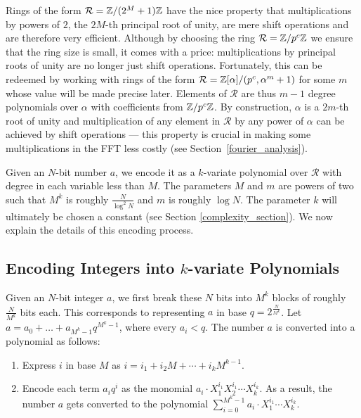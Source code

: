\documentclass[11pt]{article}
\begin{document}
Rings of the form $\mathcal{R} = \mathbb{Z}/(2^M + 1) \mathbb{Z}$ have the nice
property that multiplications by powers of $2$, the $2M$-th principal
root of unity, are mere shift operations and are therefore very
efficient. Although by choosing the ring $\mathcal{R} = \mathbb{Z}/p^c\mathbb{Z}$ we
ensure that the ring size is small, it comes with a price:
multiplications by principal roots of unity are no longer just shift
operations. Fortunately, this can be redeemed by working with rings of
the form $\mathcal{R} = \mathbb{Z}[\alpha]/(p^c, \alpha^m + 1)$ for some $m$
whose value will be made precise later. Elements of $\mathcal{R}$ are
thus $m-1$ degree polynomials over $\alpha$ with coefficients from
$\mathbb{Z}/p^c\mathbb{Z}$. By construction, $\alpha$ is a $2m$-th root of unity and
multiplication of any element in $\mathcal{R}$ by any power of
$\alpha$ can be achieved by shift operations --- this property is
crucial in making some multiplications in the FFT less costly (see
Section~\ref{fourier_analysis}).

Given an $N$-bit number $a$, we encode it as a $k$-variate polynomial
over $\mathcal{R}$ with degree in each variable less than $M$. The
parameters $M$ and $m$ are powers of two such that $M^k$ is roughly
$\frac{N}{\log^2N}$ and $m$ is roughly $\log{N}$. The parameter $k$
will ultimately be chosen a constant (see Section
\ref{complexity_section}). We now explain the details of this encoding
process.

\subsection{Encoding Integers into $k$-variate
  Polynomials}\label{encoding_section}

Given an $N$-bit integer $a$, we first break these $N$ bits into $M^k$
blocks of roughly $\frac{N}{M^k}$ bits each. This corresponds to
representing $a$ in base $q = 2^{\frac{N}{M^k}}$.  Let $a = a_0 +
\ldots + a_{M^k-1}q^{M^k - 1}$, where every $a_i < q$. The number $a$
is converted into a polynomial as follows:
\begin{enumerate}
\item Express $i$ in base $M$ as $i = i_1 + i_2M + \cdots +
  i_kM^{k-1}$. \label{base_M_item}
\item Encode each term $a_iq^i$ as the monomial $a_i\cdot
  X_1^{i_1}X_2^{i_1}\cdots X_k^{i_k}$. As a result, the number $a$
  gets converted to the polynomial $\sum_{i=0}^{M^k - 1}
  a_i\cdot X_1^{i_1}\cdots X_k^{i_k}$.
\end{enumerate}
\end{document}
